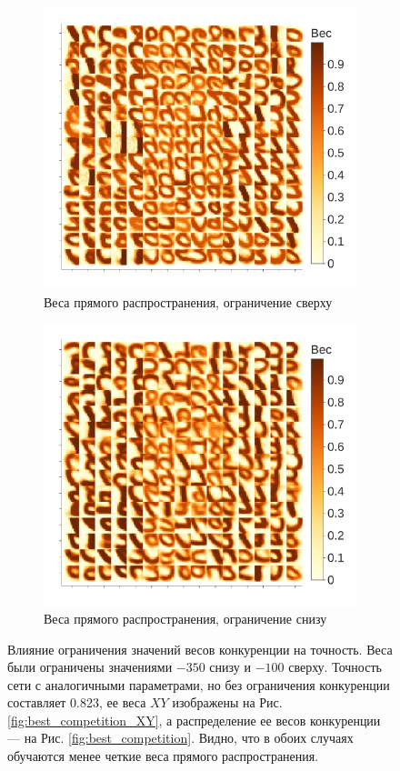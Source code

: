 \documentclass[a4paper]{article}
\begin{document}
\begin{figure}
\begin{subfigure}{0.45\textwidth}
    \includegraphics[width=\textwidth,keepaspectratio=true]{weights_XY_clamp_low_ru.pdf}
    \caption{Веса прямого распространения, ограничение сверху}
\end{subfigure} 
\begin{subfigure}{0.45\textwidth}
    \includegraphics[width=\textwidth,keepaspectratio=true]{weights_XY_clamp_high_ru.pdf}
    \caption{Веса прямого распространения, ограничение снизу}
\end{subfigure} 
\caption{Влияние ограничения значений весов конкуренции на точность. Веса были ограничены значениями $-350$ снизу и $-100$ сверху. Точность сети с аналогичными параметрами, но без ограничения конкуренции составляет 0.823, ее веса $XY$ изображены на Рис. \ref{fig:best_competition_XY}, а распределение ее весов конкуренции --- на Рис. \ref{fig:best_competition}. Видно, что в обоих случаях обучаются менее четкие веса прямого распространения.}
\label{fig:compe_clamp}
\end{figure}
\end{document}
